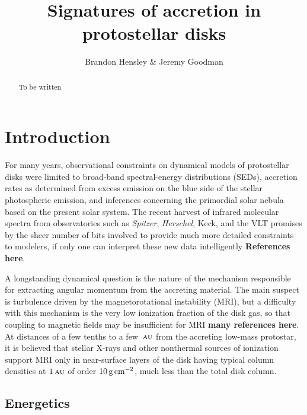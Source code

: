 \documentclass[12pt,preprint]{aastex}
\newcommand{\unit}[1]{\,{\rm #1}}
\newcommand{\gcmsq}{\unit{g\,cm^{-2}}}
\newcommand{\au}{\,\textsc{au}}
\newcommand{\remark}[1]{{\color{red}\bf#1}} %
\begin{document}
\title{Signatures of accretion in protostellar disks}

\author{Brandon Hensley  \& Jeremy Goodman  }
\begin{abstract}
To be written
\end{abstract}


\section{Introduction}
\label{sec:intro}
For many years, observational constraints on dynamical models of protostellar disks were
limited to broad-band spectral-energy distributions (SEDs), accretion rates as determined
from excess emission on the blue side of the stellar photospheric emission, and inferences
concerning the primordial solar nebula based on the present solar system.  The recent
harvest of infrared molecular spectra from observatories such as {\it Spitzer}, {\it
  Herschel}, Keck, and the VLT promises by the sheer number of bits involved to provide
much more detailed constraints to modelers, if only one can interpret these new data
intelligently \remark{References here}.

A longstanding dynamical question is the nature of the mechanism responsible for
extracting angular momentum from the accreting material.  The main suspect is turbulence
driven by the magnetorotational instability (MRI), but a difficulty with this mechanism is
the very low ionization fraction of the disk gas, so that coupling to magnetic fields may
be insufficient for MRI \remark{many references here}.  At distances of a few tenths to a
few $\au$ from the accreting low-mass protostar, it is believed that stellar X-rays and
other nonthermal sources of ionization support MRI only in near-surface layers of the disk
having typical column densities at $1\au$ of order $10\gcmsq$, much less than the total
disk column\citep[and references
therein]{Gammie96,Glassgold+etal97,Bai+Goodman2009}.

\subsection{Energetics}\label{subsec:energetics}
\end{document}

